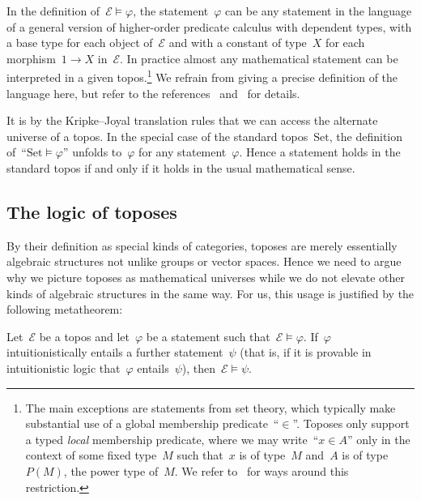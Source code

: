 \documentclass[graybox]{svmult}
\renewcommand{\E}{\mathcal{E}}
\newcommand{\Set}{\mathrm{Set}}
\renewcommand{\_}{\mathpunct{.}\,}
\newcommand{\?}{\,{:}\,}
\begin{document}
In the definition of~$\E \models \varphi$, the statement~$\varphi$ can be any
statement in the language of a general version of higher-order predicate
calculus with dependent types, with a base type for each object of~$\E$ and
with a constant of type~$X$ for each morphism~$1 \to X$ in~$\E$. In practice almost any mathematical statement
can be interpreted in a given topos.\footnote{The main exceptions are
statements from set theory, which typically make substantial use of a global
membership predicate~``$\in$''. Toposes only support a typed \emph{local}
membership predicate, where we may write~``$x \in A$'' only in the context of
some fixed type~$M$ such that~$x$ is of type~$M$ and~$A$ is of
type~$P(M)$, the power type of~$M$. We refer
to~\cite{fourman:sheaf-models,streicher:forcizf,awodey-butz-simpson-streicher:bist}
for ways around this restriction.} We refrain from giving a precise definition
of the language here, but refer to the references~\cite[Section~7]{shulman:stack}
and~\cite[Section~VI.7]{moerdijk-maclane:sheaves-logic} for details.

It is by the Kripke--Joyal translation rules that we can access the alternate
universe of a topos. In the special case of the standard topos~$\Set$, the
definition of~``$\Set \models \varphi$'' unfolds to~$\varphi$ for any
statement~$\varphi$. Hence a statement holds in the standard topos if and only
if it holds in the usual mathematical sense.



\subsection{The logic of toposes}\label{sect:logic-of-toposes}
By their definition as special kinds of
categories, toposes are merely essentially algebraic structures not unlike groups or vector
spaces. Hence we need to argue why we picture toposes as mathematical universes
while we do not elevate other kinds of algebraic structures in the same way.
For us, this usage is justified by the following metatheorem:

\begin{theorem}\label{thm:reasoning}Let~$\E$ be a topos and let~$\varphi$ be a
statement such that~$\E \models \varphi$. If~$\varphi$ intuitionistically
entails a further statement~$\psi$ (that is, if it is provable in
intuitionistic logic that~$\varphi$ entails~$\psi$), then~$\E \models
\psi$.\end{theorem}
\end{document}
